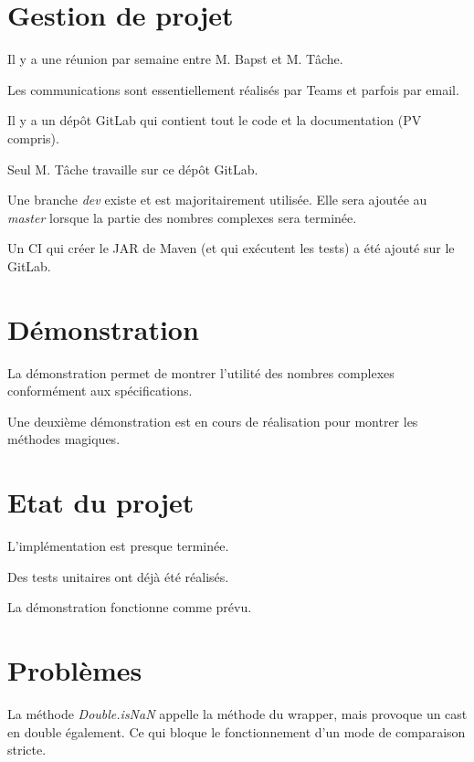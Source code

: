 \documentclass[11pt]{meetingmins}
\begin{document}
\section{Gestion de projet}
\begin{hiddenitems}
    \item Il y a une réunion par semaine entre M. Bapst et M. Tâche.
    \item Les communications sont essentiellement réalisés par Teams et parfois par email.
    \item Il y a un dépôt GitLab qui contient tout le code et la documentation (PV compris).
    \item Seul M. Tâche travaille sur ce dépôt GitLab.
    \item Une branche \textit{dev} existe et est majoritairement utilisée. Elle sera ajoutée au \textit{master} lorsque la partie des nombres complexes sera terminée.
    \item Un CI qui créer le JAR de Maven (et qui exécutent les tests) a été ajouté sur le GitLab.
\end{hiddenitems}

\section{Démonstration}
\begin{hiddenitems}
    \item La démonstration permet de montrer l'utilité des nombres complexes conformément aux spécifications.
    \item Une deuxième démonstration est en cours de réalisation pour montrer les méthodes magiques.
\end{hiddenitems}

\section{Etat du projet}
\begin{hiddenitems}
    \item L'implémentation est presque terminée.
    \item Des tests unitaires ont déjà été réalisés.
    \item La démonstration fonctionne comme prévu.
\end{hiddenitems}

\section{Problèmes}
\begin{hiddenitems}
    \item La méthode \textit{Double.isNaN} appelle la méthode du wrapper, mais provoque un cast en double également. Ce qui bloque le fonctionnement d'un mode de comparaison stricte.
\end{hiddenitems}
\end{document}
